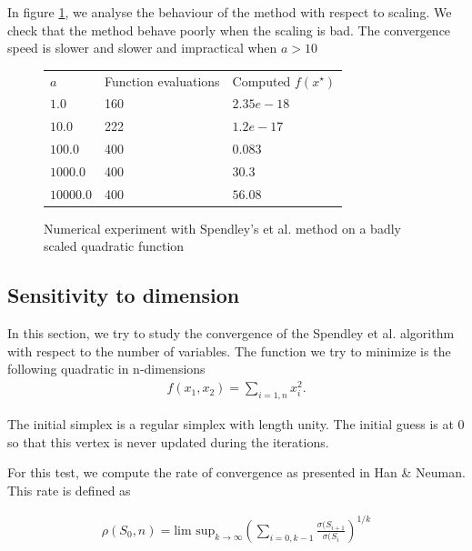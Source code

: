 In figure \ref{fig-spendley-numexp2-scaling}, we analyse the 
behaviour of the method with respect to scaling.
We check that the method behave poorly when the scaling is 
bad. The convergence speed is slower and slower and impractical 
when $a>10$

\begin{figure}[htbp]
\begin{center}
\begin{tiny}
\begin{tabular}{|l|l|l|}
\hline
$a$ & Function evaluations & Computed $f(x^\star)$ \\
$1.0$ & 160 & $2.35e-18$ \\
$10.0$ & 222 & $1.2e-17$ \\
$100.0$ & 400 & $0.083$ \\
$1000.0$ & 400 & $30.3$ \\
$10000.0$ & 400 & $56.08$ \\
\hline
\end{tabular}
\end{tiny}
\end{center}
\caption{Numerical experiment with Spendley's et al. method on a badly scaled quadratic function}
\label{fig-spendley-numexp2-scaling}
\end{figure}

\subsection{Sensitivity to dimension}

In this section, we try to study the convergence of the 
Spendley et al. algorithm with respect to the number of variables.
The function we try to minimize is the following quadratic 
in n-dimensions 
\begin{eqnarray}
\label{quadratic-sp-function3}
f(x_1,x_2) = \sum_{i=1,n} x_i^2.
\end{eqnarray}

The initial simplex is a regular simplex with length unity.
The initial guess is at 0 so that this vertex is never updated 
during the iterations.

For this test, we compute the rate of convergence as presented
in Han \& Neuman. This rate is defined as 

\begin{eqnarray}
\label{rho-sp-rate-convergence}
\rho(S_0,n) = \textrm{lim sup}_{k\rightarrow \infty} 
\left(\sum_{i=0,k-1} \frac{\sigma(S_{i+1}}{\sigma(S_i}\right)^{1/k}
\end{eqnarray}

